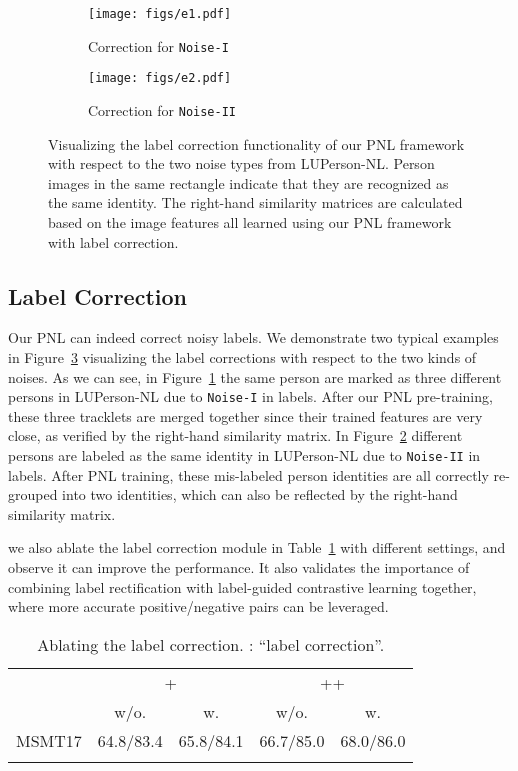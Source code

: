\documentclass[10pt,twocolumn,letterpaper]{article}
\begin{document}
\begin{figure}[t]
\begin{center}
    \begin{subfigure}{3.3in}
        \texttt{[image: figs/e1.pdf]}
        \caption{Correction for \texttt{Noise-I}}
        \label{fig:vis-lc-i}
    \end{subfigure}
    \begin{subfigure}{3.25in}
        \texttt{[image: figs/e2.pdf]}
        \caption{Correction for \texttt{Noise-II}}
        \label{fig:vis-lc-ii}
    \end{subfigure}    
\end{center}
\caption{Visualizing the label correction functionality of our PNL framework with respect to the two noise types from LUPerson-NL. Person images in the same rectangle indicate that they are  recognized as the same identity. The right-hand similarity matrices are calculated based on the image features all learned using our PNL framework with label correction.}
\label{fig:vis-lc}
\end{figure}

\subsection{Label Correction}
Our PNL can indeed correct noisy labels. We demonstrate two typical examples in Figure~\ref{fig:vis-lc} visualizing the label corrections with respect to the two kinds of noises. 
As we can see, in Figure~\ref{fig:vis-lc-i} the same person are marked as three different persons in LUPerson-NL due to \texttt{Noise-I} in labels. 
After our PNL pre-training, these three tracklets are merged together since their trained features are very close, as verified by the right-hand similarity matrix.
In Figure~\ref{fig:vis-lc-ii} different persons are labeled as the same identity in LUPerson-NL due to \texttt{Noise-II} in labels. 
After PNL training, these mis-labeled person identities are all correctly re-grouped into two identities, which can also be reflected by the right-hand similarity matrix. 

we also ablate the label correction module in Table~\ref{tab:lc} with different settings, and observe it can improve the performance. It also validates the importance of combining label rectification with label-guided contrastive learning together, where more accurate positive/negative pairs can be leveraged.


\begin{table}[t]
\setlength{\tabcolsep}{2.8mm}
    \centering
    \footnotesize
    \begin{tabular}{l|c|c|c|c}
    \shline
    \multirow{2}{*}{setting} & \multicolumn{2}{c|}{+} & \multicolumn{2}{c}{++} \\
    \cline{2-5} & w/o.  & w.        & w/o.          & w.          \\ 
    \hline
    MSMT17  & 64.8/83.4  & 65.8/84.1   & 66.7/85.0 & 68.0/86.0  \\
    \shline
    \end{tabular}
\caption{Ablating the label correction. : ``label correction''.}
    \label{tab:lc}
\end{table}
\end{document}
